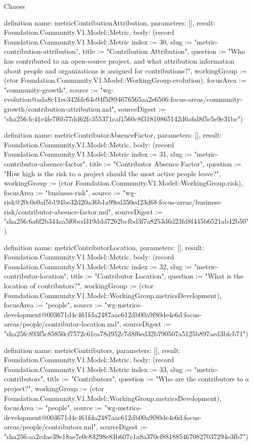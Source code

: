 \begin{lexlean}{Chaoss}
\begin{semanticmodule}
definition{
  name: metricContributionAttribution,
  parameters: [],
  result: Foundation.Community.V1.Model::Metric,
  body: (record Foundation.Community.V1.Model::Metric {index := 30, slug := "metric-contribution-attribution", title := "Contribution Attribution", question := "Who has contributed to an open-source project, and what attribution information about people and organizations is assigned for contributions?", workingGroup := (ctor Foundation.Community.V1.Model::WorkingGroup.evolution), focusArea := "community-growth", source := "wg-evolution@ada8c11ee342fdc64e94f5f894676565aa2e6506:focus-areas/community-growth/contribution-attribution.md", sourceDigest := "sha256:fc41e4fe7f6b77dd62fc355371caf1560c8f31810865142d6a6d8f5c5e9e31bc"})
}

definition{
  name: metricContributorAbsenceFactor,
  parameters: [],
  result: Foundation.Community.V1.Model::Metric,
  body: (record Foundation.Community.V1.Model::Metric {index := 31, slug := "metric-contributor-absence-factor", title := "Contributor Absence Factor", question := "How high is the risk to a project should the most active people leave?", workingGroup := (ctor Foundation.Community.V1.Model::WorkingGroup.risk), focusArea := "business-risk", source := "wg-risk@20c0e0af5b194be32d20a36b1a99ed350ed23d68:focus-areas/business-risk/contributor-absence-factor.md", sourceDigest := "sha256:6a6f2b344aa5f0bed319ddd7262bcfbd3f7a8253d6d23fd8f445b6521ab42b50"})
}

definition{
  name: metricContributorLocation,
  parameters: [],
  result: Foundation.Community.V1.Model::Metric,
  body: (record Foundation.Community.V1.Model::Metric {index := 32, slug := "metric-contributor-location", title := "Contributor Location", question := "What is the location of contributors?", workingGroup := (ctor Foundation.Community.V1.Model::WorkingGroup.metricsDevelopment), focusArea := "people", source := "wg-metrics-development@003671d4c461fda2487aae612db00a9f80de4e6d:focus-areas/people/contributor-location.md", sourceDigest := "sha256:893f5c85850cf7572c61ea78d952c7d8f6ed32b790507a5125b897aed3bfcb71"})
}

definition{
  name: metricContributors,
  parameters: [],
  result: Foundation.Community.V1.Model::Metric,
  body: (record Foundation.Community.V1.Model::Metric {index := 33, slug := "metric-contributors", title := "Contributors", question := "Who are the contributors to a project?", workingGroup := (ctor Foundation.Community.V1.Model::WorkingGroup.metricsDevelopment), focusArea := "people", source := "wg-metrics-development@003671d4c461fda2487aae612db00a9f80de4e6d:focus-areas/people/contributors.md", sourceDigest := "sha256:aa2cdae39e18ae7e0c83298e83b607e1a8a370cf8818854670827037294e3fb7"})
}


\end{semanticmodule}
\end{lexlean}

